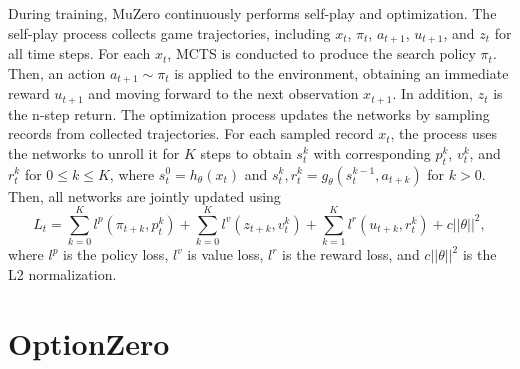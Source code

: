 During training, MuZero continuously performs self-play and optimization.
The self-play process collects game trajectories, including $x_t$, $\pi_t$, $a_{t+1}$, $u_{t+1}$, and $z_t$ for all time steps.
For each $x_t$, MCTS is conducted to produce the search policy $\pi_t$.
Then, an action $a_{t+1} \sim \pi_t$ is applied to the environment, obtaining an immediate reward $u_{t+1}$ and moving forward to the next observation $x_{t+1}$.
In addition, $z_t$ is the n-step return.
The optimization process updates the networks by sampling records from collected trajectories.
For each sampled record $x_t$, the process uses the networks to unroll it for $K$ steps to obtain $s_t^k$ with corresponding $p_t^k$, $v_t^k$, and $r_t^k$ for $0 \leq k \leq K$, where $s_t^0 = h_\theta(x_t)$ and $s_t^k, r_t^k = g_\theta(s_t^{k-1}, a_{t+k})$ for $k > 0$.
Then, all networks are jointly updated using
\begin{equation}\label{eq:mz_loss}
L_t=\sum_{k=0}^{K}l^{p}(\pi_{t+k},p_t^k)
+\sum_{k=0}^{K}l^{v}(z_{t+k},v_t^{k})
+\sum_{k=1}^{K}l^{r}(u_{t+k},r_t^{k})
+c||\theta||^{2},
\end{equation}
where $l^p$ is the policy loss, $l^v$ is value loss, $l^r$ is the reward loss, and $c||\theta||^{2}$ is the L2 normalization.



\section{OptionZero}\label{sec:ozero}


